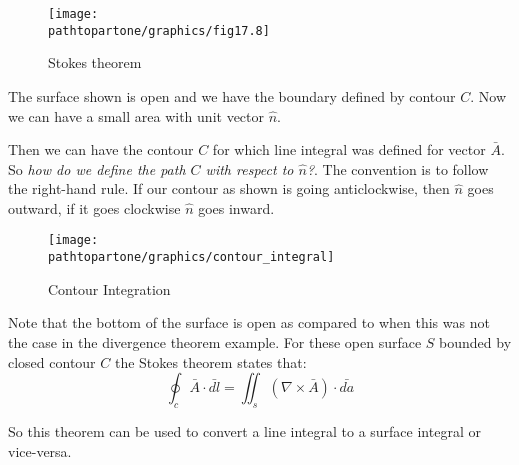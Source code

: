 \begin{figure}[h]
\centering
\texttt{[image: \\pathtopartone/graphics/fig17.8]}
\caption{Stokes theorem}
\end{figure}


The surface shown is open and we have the boundary defined by contour $C$. Now we can have a small area with unit vector $\hat{n}$.

Then we can have the contour $C$ for which line integral was defined for vector $\bar{A}$. So \emph{how do we define the path $C$ with respect to $\hat{n}$?}. The convention is to follow the right-hand rule. If our contour as shown is going anticlockwise, then $\hat{n}$ goes outward, if it goes clockwise $\hat{n}$ goes inward.

\begin{figure}
\centering
\texttt{[image: \\pathtopartone/graphics/contour\_integral]}
\caption{Contour Integration}
\end{figure}

Note that the bottom of the surface is open as compared to when this was not the case in the divergence theorem example. For these open surface $S$ bounded by closed contour $C$ the Stokes theorem states that:
\begin{equation}
\oint_c \bar{A} \cdot \bar{dl} = \iint_s  (\nabla \times \bar{A})\cdot\bar{da}
\end{equation}

So this theorem can be used to convert a line integral to a surface integral or vice-versa.

